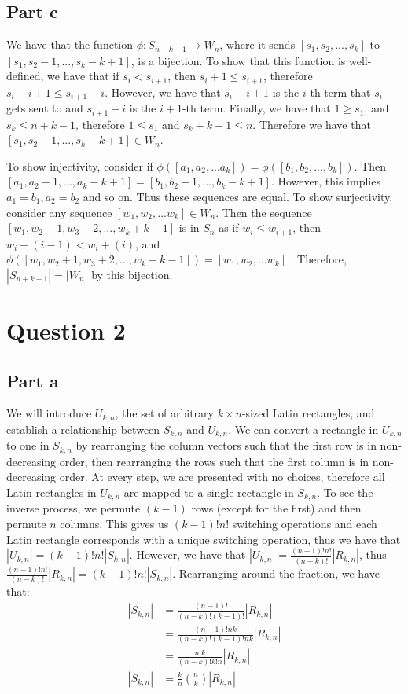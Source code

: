 \documentclass[]{article}
\begin{document}
\subsection{Part c}
We have that the function $\phi: S_{n + k - 1} \rightarrow W_n$, where it sends $[s_1, s_2, ..., s_{k}]$ to $[s_1, s_2 - 1, ..., s_{k} - k + 1]$, is a bijection. 
To show that this function is well-defined, we have that if $s_i < s_{i+1}$, then $s_i + 1 \leq s_{i + 1}$, therefore $s_i - i + 1 \leq s_{i + 1} - i$. However, we have that $s_i - i + 1$ is the $i$-th term that $s_i$ gets sent to and $s_{i + 1} - i$ is the $i + 1$-th term. Finally, we have that $1 \geq s_1$, and $s_k \leq n + k - 1$, therefore $ 1 \leq s_1 $ and $s_k + k - 1 \leq n$. Therefore we have that $[s_1, s_2 - 1, ..., s_{k} - k + 1] \in W_n$. 

To show injectivity, consider if $\phi([a_1, a_2, ... a_k]) = \phi([b_1, b_2, ..., b_k])$. Then $[a_1, a_2 -1, ..., a_k - k + 1] = [b_1, b_2 -1, ..., b_k - k + 1]$. However, this implies $a_1 = b_1, a_2 = b_2$ and so on. Thus these sequences are equal.
To show surjectivity, consider any sequence $[w_1, w_2, ... w_k]\in W_n$. Then the sequence $[w_1, w_2 + 1, w_3 + 2, ..., w_k + k - 1]$ is in $S_n$ as if $w_i \leq w_{i + 1}$, then $w_{i} + (i - 1) < w_i + (i)$, and $\phi([w_1, w_2 + 1, w_3 + 2, ..., w_k + k - 1]) = [w_1, w_2, ... w_k]$ . Therefore, $|S_{n + k - 1}| = |W_n|$ by this bijection. 
\section{Question 2}
\subsection{Part a}
We will introduce $U_{k, n}$, the set of arbitrary $k \times n$-sized Latin rectangles, and establish a relationship between $S_{k,n}$ and $U_{k,n}$. We can convert a rectangle in $U_{k,n}$ to one in $S_{k,n}$ by rearranging the column vectors such that the first row is in non-decreasing order, then rearranging the rows such that the first column is in non-decreasing order. At every step, we are presented with no choices, therefore all Latin rectangles in $U_{k,n}$ are mapped to a single rectangle in $S_{k,n}$. To see the inverse process, we permute $(k - 1)$ rows (except for the first) and then permute $n$ columns. This gives us $(k - 1)! n!$ switching operations and each Latin rectangle corresponds with a unique switching operation, thus we have that $|U_{k, n}| = (k - 1)! n! |S_{k, n}|$. However, we have that $|U_{k, n}| = \frac{(n - 1)! n!}{(n-k)!} |R_{k,n}|$, thus $\frac{(n - 1)! n!}{(n-k)!} |R_{k,n}|= (k - 1)! n! |S_{k, n}|$. Rearranging around the fraction, we have that:
\begin{align*}
	|S_{k, n}| &= \frac{(n - 1)!}{(n-k)!(k - 1)!} |R_{k,n}|\\
	&= \frac{(n - 1)! n k}{(n-k)!(k - 1)! n k} |R_{k,n}|\\
	&= \frac{n! k}{(n-k)! k! n} |R_{k, n}|\\
	|S_{k, n}| &= \frac{k}{n} \binom{n}{k} |R_{k, n}|
\end{align*}
\end{document}
